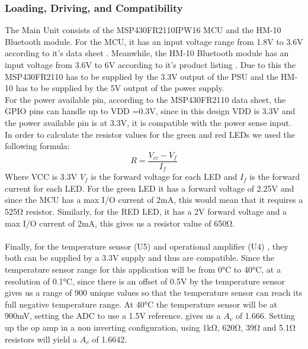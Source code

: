 \subsubsection{Loading, Driving, and Compatibility}
The Main Unit consists of the MSP430FR2110IPW16 MCU and the HM-10 Bluetooth module. For the MCU, it has an input voltage range from 1.8\si{\V} to 3.6\si{\V} according to it's data sheet \cite{MSP430FR2110IPW16R}. Meanwhile, the HM-10 Bluetooth module has an input voltage from 3.6\si{\V} to 6\si{\V} according to it's product listing \cite{AmazonComHiLetgo}. Due to this the MSP430FR2110 has to be supplied by the 3.3\si{V} output of the PSU and the HM-10 has to be supplied by the 5\si{\V} output of the power supply.\\
For the power available pin, according to the MSP430FR2110 data sheet, the GPIO pins can handle up to VDD =0.3\si{\V}, since in this design VDD is 3.3\si{\V} and the power available pin is at 3.3\si{\V}, it is compatible with the power sense input.\\
In order to calculate the resistor values for the green and red LEDs we used the following formula:
\begin{equation}
R = \frac{V_{cc} - V_{f}}{I_{f}}
\end{equation}
Where VCC is 3.3\si{\V} $V_{f}$ is the forward voltage for each LED and $I_{f}$ is the forward current for each LED. For the green LED \cite{GreenDiffused5mmStandard} it has a forward voltage of 2.25\si{\V} and since the MCU has a max I/O current of 2\si{\mA}, this would mean that it requires a 525\si{\ohm} resistor. Similarly, for the RED LED, it has a 2\si{\V} forward voltage and a max I/O current of 2\si{\mA}, this gives us a resistor value of  650\si{\ohm}.\\\\
Finally, for the temperature sensor (U5) \cite{TMP36GT9Z} and operational amplifier (U4) \cite{MCP6022I}, they both can be supplied by a 3.3\si{\V} supply and thus are compatible. Since the temperature sensor range for this application will be from 0\si{\celsius} to 40\si{\celsius}, at a resolution of 0.1\si{\celsius}, since there is an offset of 0.5\si{\V} by the temperature sensor gives us a range of 900 unique values so that the temperature sensor can reach its full negative temperature range. At 40\si{\celsius} the temperature sensor will be at 900\si{\milli\volt}, setting the ADC to use a 1.5\si{\V} reference. gives us a $A_{v}$ of 1.666. Setting up the op amp in a non inverting configuration, using 1\si{\kilo\ohm}, 620\si{\ohm}, 39\si{\ohm} and 5.1\si{\ohm} resistors will yield a $A_{v}$ of 1.6642.
